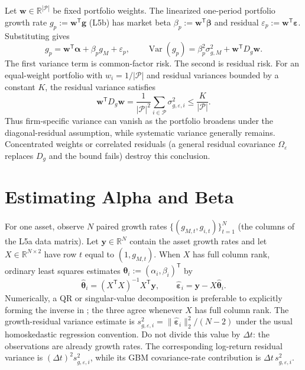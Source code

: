 \documentclass[11pt]{article}
\newcommand{\R}{\mathbb{R}}
\newcommand{\Var}{\operatorname{Var}}
\newcommand{\np}{|\mathcal P|}
\begin{document}
Let $\mathbf w\in\R^{\np}$ be fixed portfolio weights. The linearized one-period portfolio growth rate $g_p:=\mathbf w^{\mathsf T}\mathbf g$ (L5b) has market beta $\beta_p:=\mathbf w^{\mathsf T}\boldsymbol\beta$ and residual $\varepsilon_p:=\mathbf w^{\mathsf T}\boldsymbol\varepsilon$. Substituting  gives
\begin{equation}
  \label{eq:portfolio-sim}
  g_p=\mathbf w^{\mathsf T}\boldsymbol\alpha+\beta_p g_M+\varepsilon_p,
  \qquad
  \Var(g_p)=\beta_p^2\sigma_{g,M}^2+\mathbf w^{\mathsf T}D_g\mathbf w.
\end{equation}
The first variance term is common-factor risk. The second is residual risk. For an equal-weight portfolio with $w_i=1/\np$ and residual variances bounded by a constant $K$, the residual variance satisfies
\begin{equation}
  \label{eq:diversification-bound}
  \mathbf w^{\mathsf T}D_g\mathbf w
  =\frac{1}{\np^2}\sum_{i\in\mathcal P}\sigma_{g,\varepsilon,i}^2
  \leq\frac{K}{\np}.
\end{equation}
Thus firm-specific variance can vanish as the portfolio broadens under the diagonal-residual assumption, while systematic variance generally remains. Concentrated weights or correlated residuals (a general residual covariance $\Omega_\varepsilon$ replaces $D_g$ and the bound fails) destroy this conclusion.

\section{Estimating Alpha and Beta}

For one asset, observe $N$ paired growth rates $\{(g_{M,t},g_{i,t})\}_{t=1}^N$ (the columns of the L5a data matrix). Let $\mathbf y\in\R^N$ contain the asset growth rates and let $X\in\R^{N\times2}$ have row $t$ equal to $(1,g_{M,t})$. When $X$ has full column rank, ordinary least squares estimates $\boldsymbol\theta_i:=(\alpha_i,\beta_i)^{\mathsf T}$ by
\begin{equation}
  \label{eq:ols}
  \widehat{\boldsymbol\theta}_i
  =(X^{\mathsf T}X)^{-1}X^{\mathsf T}\mathbf y,
  \qquad
  \widehat{\boldsymbol\varepsilon}_{i}
  =\mathbf y-X\widehat{\boldsymbol\theta}_i.
\end{equation}
Numerically, a QR or singular-value decomposition is preferable to explicitly forming the inverse in ; the three agree whenever $X$ has full column rank. The growth-residual variance estimate is $s_{g,\varepsilon,i}^2=\|\widehat{\boldsymbol\varepsilon}_{i}\|_2^2/(N-2)$ under the usual homoskedastic regression convention. Do not divide this value by $\Delta t$: the observations are already growth rates. The corresponding log-return residual variance is $(\Delta t)^2s_{g,\varepsilon,i}^2$, while its GBM covariance-rate contribution is $\Delta t\,s_{g,\varepsilon,i}^2$.
\end{document}
